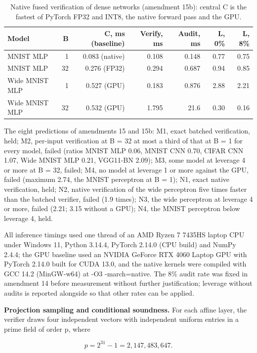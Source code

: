 \documentclass[11pt]{article}
\newcommand{\botrule}{\bottomrule}
\begin{document}
\begin{table}[htbp]
\caption{Native fused verification of dense networks (amendment 15b): central C is the fastest of PyTorch FP32 and INT8, the native forward pass and the GPU.}
\centering
\small
\begin{tabularx}{\textwidth}{Xrrrrrr}
\toprule
Model & B & C, ms (baseline) & Verify, ms & Audit, ms & L, 0\% & L, 8\% \\
\midrule
MNIST MLP & 1 & 0.083 (native) & 0.108 & 0.148 & 0.77 & 0.75 \\
MNIST MLP & 32 & 0.276 (FP32) & 0.294 & 0.687 & 0.94 & 0.85 \\
Wide MNIST MLP & 1 & 0.527 (GPU) & 0.183 & 0.876 & 2.88 & 2.21 \\
Wide MNIST MLP & 32 & 0.532 (GPU) & 1.795 & 21.6 & 0.30 & 0.16 \\
\botrule
\end{tabularx}
\end{table}

The eight predictions of amendments 15 and 15b: M1, exact batched verification, held; M2, per-input verification at B = 32 at most a third of that at B = 1 for every model, failed (ratios MNIST MLP 0.06, MNIST CNN 0.70, CIFAR CNN 1.07, Wide MNIST MLP 0.21, VGG11-BN 2.09); M3, some model at leverage 4 or more at B = 32, failed; M4, no model at leverage 1 or more against the GPU, failed (maximum 2.74, the MNIST perceptron at B = 1); N1, exact native verification, held; N2, native verification of the wide perceptron five times faster than the batched verifier, failed (1.9 times); N3, the wide perceptron at leverage 4 or more, failed (2.21; 3.15 without a GPU); N4, the MNIST perceptron below leverage 4, held.

All inference timings used one thread of an AMD Ryzen 7 7435HS laptop CPU under Windows 11, Python 3.14.4, PyTorch 2.14.0 (CPU build) and NumPy 2.4.4; the GPU baseline used an NVIDIA GeForce RTX 4060 Laptop GPU with PyTorch 2.14.0 built for CUDA 13.0, and the native kernels were compiled with GCC 14.2 (MinGW-w64) at -O3 -march=native. The 8\% audit rate was fixed in amendment 14 before measurement without further justification; leverage without audits is reported alongside so that other rates can be applied.

\textbf{Projection sampling and conditional soundness.} For each affine layer, the verifier draws four independent vectors with independent uniform entries in a prime field of order p, where

\[
p = 2^{31}-1 = 2{,}147{,}483{,}647.
\]
\end{document}
